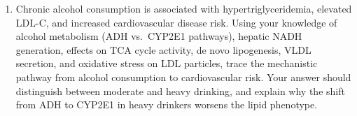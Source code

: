 \documentclass{tufte-handout}
\begin{document}
\begin{enumerate}
\item Chronic alcohol consumption is associated with hypertriglyceridemia, elevated LDL-C, and increased cardiovascular disease risk. Using your knowledge of alcohol metabolism (ADH vs.\ CYP2E1 pathways), hepatic NADH generation, effects on TCA cycle activity, de novo lipogenesis, VLDL secretion, and oxidative stress on LDL particles, trace the mechanistic pathway from alcohol consumption to cardiovascular risk. Your answer should distinguish between moderate and heavy drinking, and explain why the shift from ADH to CYP2E1 in heavy drinkers worsens the lipid phenotype.
\end{enumerate}



\end{document}
